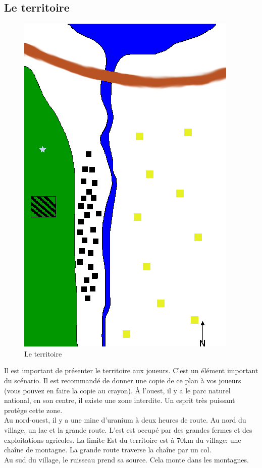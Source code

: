 \documentclass[oneside,12pt]{book}
\begin{document}
\begin{flushleft}
\subsection{Le territoire}
\begin{figure}[!ht]
\caption{\label{territoire} Le territoire}
\includegraphics[scale=0.8]{plan.png}
\end{figure}
Il est important de présenter le territoire aux joueurs. C'est un élément important du scénario. 
Il est recommandé de donner une copie de ce plan à vos joueurs (vous pouvez en faire la copie au crayon). 
À l'ouest, il y a le parc naturel national, en son centre, il existe une zone interdite. 
Un esprit très puissant protège cette zone.\\
Au nord-ouest, il y a une mine d'uranium à deux heures de route. Au nord du village, un lac et la grande route. 
L'est est occupé par des grandes fermes et des exploitations agricoles. 
La limite Est du territoire est à 70km du  village: une chaîne de montagne.  
La grande route traverse la chaîne par un col. \\
Au sud du village, le ruisseau prend sa source. Cela monte dans les montagnes. \\


\end{flushleft}
\end{document}
